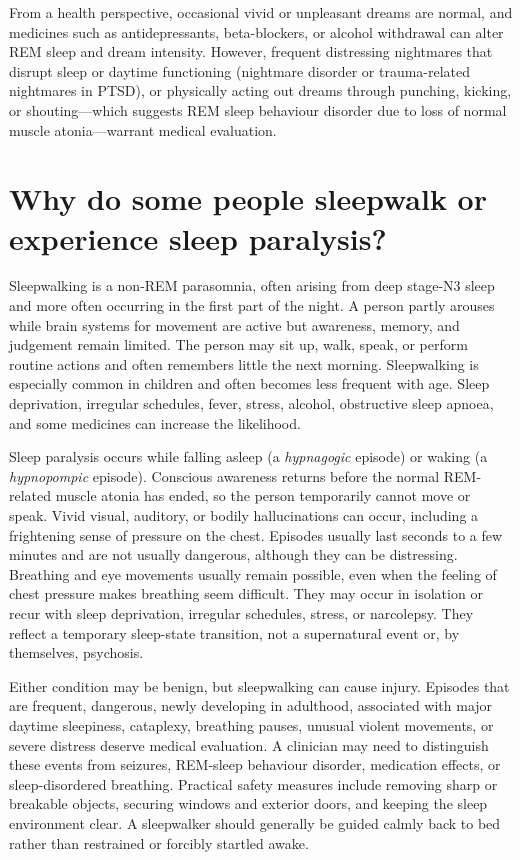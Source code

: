 \documentclass[11pt,oneside]{report}
\begin{document}
From a health perspective, occasional vivid or unpleasant dreams are normal, and
medicines such as antidepressants, beta-blockers, or alcohol withdrawal can
alter REM sleep and dream intensity. However, frequent distressing nightmares
that disrupt sleep or daytime functioning (nightmare disorder or trauma-related
nightmares in PTSD), or physically acting out dreams through punching, kicking,
or shouting—which suggests REM sleep behaviour disorder due to loss of normal
muscle atonia—warrant medical evaluation.

\section{Why do some people sleepwalk or experience sleep paralysis?}

Sleepwalking is a non-REM parasomnia, often arising from deep stage-N3 sleep
and more often occurring in the first part of the night. A person partly arouses
while brain systems for movement are active but awareness, memory, and judgement
remain limited. The person may sit up, walk, speak, or perform routine actions
and often remembers
little the next morning. Sleepwalking is especially common in children and
often becomes less frequent with age. Sleep deprivation, irregular schedules,
fever, stress, alcohol, obstructive sleep apnoea, and some medicines can
increase the likelihood.

Sleep paralysis occurs while falling asleep (a \emph{hypnagogic} episode) or
waking (a \emph{hypnopompic} episode). Conscious awareness returns before the
normal REM-related muscle atonia has ended, so the person temporarily cannot
move or speak. Vivid visual, auditory, or bodily hallucinations can occur,
including a frightening sense of pressure on the chest. Episodes usually last
seconds to a few minutes and are not usually dangerous, although they can be
distressing. Breathing and eye movements usually remain possible, even when the
feeling of chest pressure makes breathing seem difficult. They may occur in
isolation or recur with sleep deprivation, irregular schedules, stress, or
narcolepsy. They reflect a temporary sleep-state transition, not a supernatural
event or, by themselves, psychosis.

Either condition may be benign, but sleepwalking can cause injury. Episodes
that are frequent, dangerous, newly developing in adulthood, associated with
major daytime sleepiness, cataplexy, breathing pauses, unusual violent movements,
or severe distress deserve medical evaluation. A clinician may need to distinguish
these events from seizures, REM-sleep behaviour disorder, medication effects, or
sleep-disordered breathing. Practical safety measures include removing sharp or
breakable objects, securing windows and exterior doors, and keeping the sleep
environment clear. A sleepwalker should generally be guided calmly back to bed
rather than restrained or forcibly startled awake.
\end{document}
